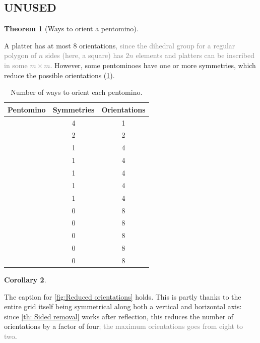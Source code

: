 \documentclass{article}
\newcommand{\pentI}{\smash{\colorbox{colorI!50}{I}}}
\newcommand{\pentF}{\smash{\colorbox{colorF!50}{F}}}%
\newcommand{\pentL}{\smash{\colorbox{colorL!50}{L}}}%
\newcommand{\pentP}{\smash{\colorbox{colorP!50}{P}}}
\newcommand{\pentN}{\smash{\colorbox{colorN!50}{N}}}
\newcommand{\pentT}{\smash{\colorbox{colorT!50}{T}}}
\newcommand{\pentU}{\smash{\colorbox{colorU!50}{U}}}
\newcommand{\pentV}{\smash{\colorbox{colorV!50}{V}}}
\newcommand{\pentW}{\smash{\colorbox{colorW!50}{W}}}
\newcommand{\pentX}{\smash{\colorbox{colorX!50}{X}}}
\newcommand{\pentY}{\smash{\colorbox{colorY!50}{Y}}}
\newcommand{\pentZ}{\smash{\colorbox{colorZ!50}{Z}}}
\theoremstyle{definition}%
\newtheorem{theorem}{Theorem}[section]
\newtheorem{corollary}[theorem]{Corollary}%
\newcommand{\minordetail}[1]{\textcolor{gray}{#1}}
\begin{document}
\clearpage
\subsection{UNUSED}
\begin{theorem}[Ways to orient a pentomino]
\label{th:Pentomino orientations}

A platter has at most 8 orientations\minordetail{, since the dihedral group for a regular polygon of $n$ sides (here, a square) has $2n$ elements and platters can be inscribed in some $m \times m$}. However, some pentominoes have one or more symmetries, which reduce the possible orientations (\cref{tab:pentomino orientations}).

    \begin{table}
        \centering
        \caption{Number of ways to orient each pentomino. \cite[0:41]{v1}}
        \begin{tabular}{ccc}
            \toprule
            Pentomino & Symmetries & Orientations \\
            \midrule
            \pentX{} & 4 & 1 \\
            \pentI{} & 2 & 2 \\
            \pentT{} & 1 & 4 \\
            \pentU{} & 1 & 4 \\
            \pentV{} & 1 & 4 \\
            \pentW{} & 1 & 4 \\
            \pentZ{} & 1 & 4 \\
            \pentF{} & 0 & 8 \\
            \pentL{} & 0 & 8 \\
            \pentP{} & 0 & 8 \\
            \pentN{} & 0 & 8 \\
            \pentY{} & 0 & 8 \\
            \bottomrule
        \end{tabular}
        \label{tab:pentomino orientations}
    \end{table}
\end{theorem}

\begin{corollary}
\label{cor:cutcorner3xn}

The caption for \cref{fig:Reduced orientations} holds. This is partly thanks to the entire grid itself being symmetrical along both a vertical and horizontal axis: since \cref{th: Sided removal} works after reflection, this reduces the number of orientations by a factor of four\minordetail{; the maximum orientations goes from eight to two}.
\end{corollary}
\end{document}
